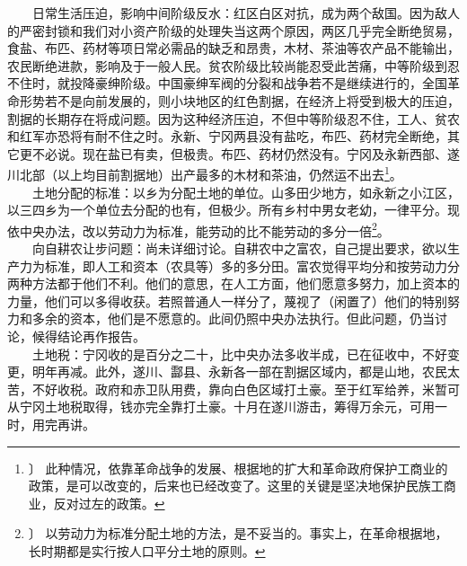 \documentclass[cn,11pt,chinese]{elegantbook}
\begin{document}
　　日常生活压迫，影响中间阶级反水：红区白区对抗，成为两个敌国。因为敌人的严密封锁和我们对小资产阶级的处理失当这两个原因，两区几乎完全断绝贸易，食盐、布匹、药材等项日常必需品的缺乏和昂贵，木材、茶油等农产品不能输出，农民断绝进款，影响及于一般人民。贫农阶级比较尚能忍受此苦痛，中等阶级到忍不住时，就投降豪绅阶级。中国豪绅军阀的分裂和战争若不是继续进行的，全国革命形势若不是向前发展的，则小块地区的红色割据，在经济上将受到极大的压迫，割据的长期存在将成问题。因为这种经济压迫，不但中等阶级忍不住，工人、贫农和红军亦恐将有耐不住之时。永新、宁冈两县没有盐吃，布匹、药材完全断绝，其它更不必说。现在盐已有卖，但极贵。布匹、药材仍然没有。宁冈及永新西部、遂川北部（以上均目前割据地）出产最多的木材和茶油，仍然运不出去\footnote[23]{〕 此种情况，依靠革命战争的发展、根据地的扩大和革命政府保护工商业的政策，是可以改变的，后来也已经改变了。这里的关键是坚决地保护民族工商业，反对过左的政策。}。\\
　　土地分配的标准：以乡为分配土地的单位。山多田少地方，如永新之小江区，以三四乡为一个单位去分配的也有，但极少。所有乡村中男女老幼，一律平分。现依中央办法，改以劳动力为标准，能劳动的比不能劳动的多分一倍\footnote[24]{〕 以劳动力为标准分配土地的方法，是不妥当的。事实上，在革命根据地，长时期都是实行按人口平分土地的原则。}。\\
　　向自耕农让步问题：尚未详细讨论。自耕农中之富农，自己提出要求，欲以生产力为标准，即人工和资本（农具等）多的多分田。富农觉得平均分和按劳动力分两种方法都于他们不利。他们的意思，在人工方面，他们愿意多努力，加上资本的力量，他们可以多得收获。若照普通人一样分了，蔑视了（闲置了）他们的特别努力和多余的资本，他们是不愿意的。此间仍照中央办法执行。但此问题，仍当讨论，候得结论再作报告。\\
　　土地税：宁冈收的是百分之二十，比中央办法多收半成，已在征收中，不好变更，明年再减。此外，遂川、酃县、永新各一部在割据区域内，都是山地，农民太苦，不好收税。政府和赤卫队用费，靠向白色区域打土豪。至于红军给养，米暂可从宁冈土地税取得，钱亦完全靠打土豪。十月在遂川游击，筹得万余元，可用一时，用完再讲。\\
\end{document}
